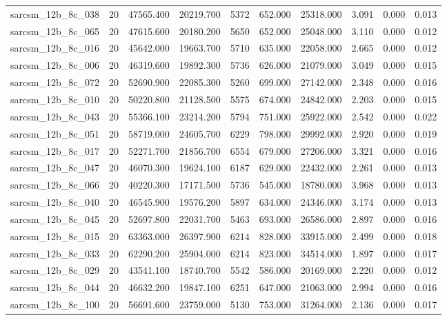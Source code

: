\begin{tabular}{lrrrrrrrrr}
sarcsm\_12b\_8c\_038 & 20 & 47565.400 & 20219.700 & 5372 & 652.000 & 25318.000 & 3.091 & 0.000 & 0.013 \\
sarcsm\_12b\_8c\_065 & 20 & 47615.600 & 20180.200 & 5650 & 652.000 & 25048.000 & 3.110 & 0.000 & 0.012 \\
sarcsm\_12b\_8c\_016 & 20 & 45642.000 & 19663.700 & 5710 & 635.000 & 22058.000 & 2.665 & 0.000 & 0.012 \\
sarcsm\_12b\_8c\_006 & 20 & 46319.600 & 19892.300 & 5736 & 626.000 & 21079.000 & 3.049 & 0.000 & 0.015 \\
sarcsm\_12b\_8c\_072 & 20 & 52690.900 & 22085.300 & 5260 & 699.000 & 27142.000 & 2.348 & 0.000 & 0.016 \\
sarcsm\_12b\_8c\_010 & 20 & 50220.800 & 21128.500 & 5575 & 674.000 & 24842.000 & 2.203 & 0.000 & 0.015 \\
sarcsm\_12b\_8c\_043 & 20 & 55366.100 & 23214.200 & 5794 & 751.000 & 25922.000 & 2.542 & 0.000 & 0.022 \\
sarcsm\_12b\_8c\_051 & 20 & 58719.000 & 24605.700 & 6229 & 798.000 & 29992.000 & 2.920 & 0.000 & 0.019 \\
sarcsm\_12b\_8c\_017 & 20 & 52271.700 & 21856.700 & 6554 & 679.000 & 27206.000 & 3.321 & 0.000 & 0.016 \\
sarcsm\_12b\_8c\_047 & 20 & 46070.300 & 19624.100 & 6187 & 629.000 & 22432.000 & 2.261 & 0.000 & 0.013 \\
sarcsm\_12b\_8c\_066 & 20 & 40220.300 & 17171.500 & 5736 & 545.000 & 18780.000 & 3.968 & 0.000 & 0.013 \\
sarcsm\_12b\_8c\_040 & 20 & 46545.900 & 19576.200 & 5897 & 634.000 & 24346.000 & 3.174 & 0.000 & 0.013 \\
sarcsm\_12b\_8c\_045 & 20 & 52697.800 & 22031.700 & 5463 & 693.000 & 26586.000 & 2.897 & 0.000 & 0.016 \\
sarcsm\_12b\_8c\_015 & 20 & 63363.000 & 26397.900 & 6214 & 828.000 & 33915.000 & 2.499 & 0.000 & 0.018 \\
sarcsm\_12b\_8c\_033 & 20 & 62290.200 & 25904.000 & 6214 & 823.000 & 34514.000 & 1.897 & 0.000 & 0.017 \\
sarcsm\_12b\_8c\_029 & 20 & 43541.100 & 18740.700 & 5542 & 586.000 & 20169.000 & 2.220 & 0.000 & 0.012 \\
sarcsm\_12b\_8c\_044 & 20 & 46632.200 & 19847.100 & 6251 & 647.000 & 21063.000 & 2.994 & 0.000 & 0.016 \\
sarcsm\_12b\_8c\_100 & 20 & 56691.600 & 23759.000 & 5130 & 753.000 & 31264.000 & 2.136 & 0.000 & 0.017 \\

\end{tabular}
